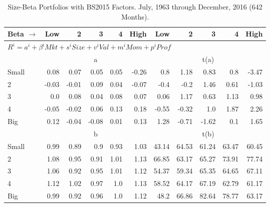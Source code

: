 
\begin{table}[!ht]
\centering
\caption{Size-Beta Portfolios with BS2015 Factors. \footnotesize{July, 1963 through December, 2016 (642 Months).}}
\begin{tabular}{lrrrrrrrrrr}
  \toprule
    Beta $\rightarrow$ & Low & 2 & 3 & 4 & High & Low & 2 & 3 & 4 & High \\ 
  \midrule
  \multicolumn{11}{l}{$R^i=a^i+\beta^iMkt+s^iSize+v^iVal+m^iMom+p^iProf$} \\

  
    
      & \multicolumn{5}{c}{a} & \multicolumn{5}{c}{t(a)}
    
    \\
      \cmidrule(r){2-6} \cmidrule(r){7-11}

    Small   & 0.08  & 0.07  & 0.05  & 0.05  & -0.26  & 0.8  & 1.18  & 0.83  & 0.8  & -3.47  \\
         2  & -0.03  & -0.01  & 0.09  & 0.04  & -0.07  & -0.4  & -0.2  & 1.46  & 0.61  & -1.03  \\
         3  & 0.0  & 0.08  & 0.04  & 0.08  & 0.07  & 0.06  & 1.17  & 0.63  & 1.13  & 0.98  \\
         4  & -0.05  & -0.02  & 0.06  & 0.13  & 0.18  & -0.55  & -0.32  & 1.0  & 1.87  & 2.26  \\
    Big     & 0.12  & -0.04  & -0.08  & 0.01  & 0.13  & 1.28  & -0.71  & -1.62  & 0.1  & 1.65  \\

  
    
      & \multicolumn{5}{c}{b} & \multicolumn{5}{c}{t(b)}
    
    \\
      \cmidrule(r){2-6} \cmidrule(r){7-11}

    Small   & 0.99  & 0.89  & 0.9  & 0.93  & 1.03  & 43.14  & 64.53  & 61.24  & 63.47  & 60.45  \\
         2  & 1.08  & 0.95  & 0.91  & 1.01  & 1.13  & 66.85  & 63.17  & 65.27  & 73.91  & 77.74  \\
         3  & 1.06  & 0.92  & 0.95  & 1.01  & 1.12  & 54.37  & 59.34  & 65.35  & 64.65  & 67.11  \\
         4  & 1.12  & 1.02  & 0.97  & 1.0  & 1.13  & 58.52  & 64.17  & 67.19  & 62.79  & 61.17  \\
    Big     & 0.99  & 0.92  & 0.96  & 1.0  & 1.12  & 48.2  & 66.86  & 82.64  & 78.77  & 63.17  \\

  
    

\end{tabular}
\end{table}

